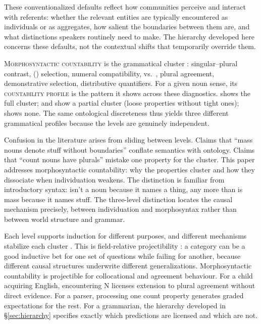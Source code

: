 \documentclass[12pt,a4paper]{article}
\begin{document}
These conventionalized defaults reflect how communities perceive and interact with referents: whether the relevant entities are typically encountered as individuals or as aggregates, how salient the boundaries between them are, and what distinctions speakers routinely need to make. The hierarchy developed here concerns these defaults, not the contextual shifts that temporarily override them.

\textsc{Morphosyntactic countability} is the grammatical cluster \citep[pp.~333--336]{huddleston2002,allan1980}: singular--plural contrast, () selection, numeral compatibility,  vs.\ , plural agreement, demonstrative selection, distributive quantifiers. For a given noun sense, its \textsc{countability profile} is the pattern it shows across these diagnostics.  shows the full cluster;  and  show a partial cluster (loose properties without tight ones);  shows none. The same ontological discreteness thus yields three different grammatical profiles because the levels are genuinely independent.

Confusion in the literature arises from sliding between levels. Claims that \enquote{mass nouns denote stuff without boundaries} conflate semantics with ontology. Claims that \enquote{count nouns have plurals} mistake one property for the cluster. This paper addresses morphosyntactic countability: why the properties cluster and how they dissociate when individuation weakens. The distinction is familiar from introductory syntax:  isn't a noun because it names a thing, any more than  is mass because it names stuff. The three-level distinction locates the causal mechanism precisely, between individuation and morphosyntax rather than between world structure and grammar.

Each level supports induction for different purposes, and different mechanisms stabilize each cluster \citep{reynolds2025stack}. This is field-relative projectibility \citep{Goodman1955,boyd1991}: a category can be a good inductive bet for one set of questions while failing for another, because different causal structures underwrite different generalizations. Morphosyntactic countability is projectible for collocational and agreement behaviour. For a child acquiring English, encountering  N licenses extension to plural agreement without direct evidence. For a parser, processing one count property generates graded expectations for the rest. For a grammarian, the hierarchy developed in \S\ref{sec:hierarchy} specifies exactly which predictions are licensed and which are not.
\end{document}
